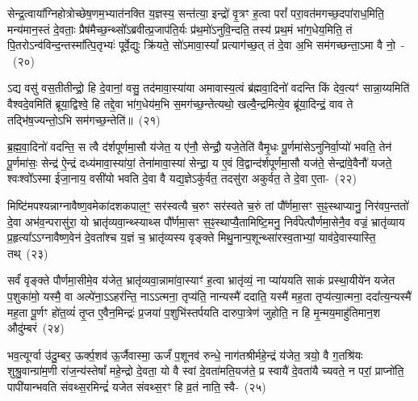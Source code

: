 सेन्द्र॒त्वाया᳚ग्निहोत्रोच्छेष॒णम॒भ्यात॑नक्ति य॒ज्ञस्य॒ सन्त॑त्या॒ इन्द्रो॑ वृ॒त्रꣳ ह॒त्वा परां᳚ परा॒वत॑मगच्छ॒दपा॑राध॒मिति॒ मन्य॑मान॒स्तं दे॒वताः॒ प्रैष॑मैच्छ॒न्थ्सो᳚\-ऽब्रवीत्प्र॒जा\-प॑ति॒र्यः प्र॑थ॒मो॑\-ऽनुवि॒न्दति॒ तस्य॑ प्रथ॒मं भा॑ग॒धेय॒मिति॒ तं पि॒तरो\-ऽन्व॑विन्द॒न्तस्मा᳚त्पि॒तृभ्यः॑ पूर्वे॒द्युः क्रि॑यते॒ सो॑\-ऽमावा॒स्यां᳚ प्रत्याग॑च्छ॒त् तं दे॒वा अ॒भि सम॑गच्छन्ता॒\-ऽमा वै नो॒~-~(२०)\ip

ऽद्य वसु॑ वस॒तीतीन्द्रो॒ हि दे॒वानां॒ वसु॒ तद॑मावा॒स्या॑या अमावास्य॒त्वं ब्र॑ह्मवा॒दिनो॑ वदन्ति किं देव॒त्यꣳ॑ सान्ना॒य्यमिति॑ वैश्वदे॒वमिति॑ ब्रूया॒द्विश्वे॒ हि तद्दे॒वा भा॑ग॒धेय॑म॒भि स॒मग॑च्छ॒न्तेत्यथो॒ खल्वै॒न्द्रमित्ये॒व ब्रू॑या॒दिन्द्रं॒ वाव ते तद्भि॑ष॒ज्यन्तो॒\-ऽभि सम॑गच्छ॒न्तेति॑॥~(२१)\ip

{}

ब्र॒ह्म॒वा॒दिनो॑ वदन्ति॒ स त्वै द॑र्\mbox{}शपूर्णमा॒सौ य॑जेत॒ य ए॑नौ॒ सेन्द्रौ॒ यजे॒तेति॑ वैमृ॒धः पू॒र्णमा॑से\-ऽनुनिर्वा॒प्यो॑ भवति॒ तेन॑ पू॒र्णमा॑सः॒ सेन्द्र॑ ऐ॒न्द्रं दध्य॑मावा॒स्या॑यां॒ तेना॑मावा॒स्या॑ सेन्द्रा॒ य ए॒वं वि॒द्वान्द॑र्\mbox{}शपूर्णमा॒सौ यज॑ते॒ सेन्द्रा॑वे॒वैनौ॑ यजते॒ श्वःश्वो᳚\-ऽस्मा ईजा॒नाय॒ वसी॑यो भवति दे॒वा वै यद्य॒ज्ञे\-ऽकु॑र्वत॒ तदसु॑रा अकुर्वत॒ ते दे॒वा ए॒ता-~(२२)\ip

मिष्टि॑मपश्यन्नाग्नावैष्ण॒वमेका॑\-दश\-कपाल॒ꣳ॒ सर॑स्वत्यै च॒रुꣳ सर॑स्वते च॒रुं तां पौ᳚र्णमा॒सꣳ स॒ꣴ॒स्थाप्यानु॒ निर॑वप॒न्ततो॑ दे॒वा अभ॑व॒न्परासु॑रा॒ यो भ्रातृ॑व्यवा॒न्थ्स्याथ्स पौ᳚र्णमा॒सꣳ स॒ꣴ॒स्थाप्यै॒तामिष्टि॒मनु॒ निर्व॑पेत्पौर्णमा॒सेनै॒व वज्रं॒ भ्रातृ॑व्याय प्र॒हृत्या᳚\-ऽऽ\-ग्नावैष्ण॒वेन॑ दे॒वता᳚श्च य॒ज्ञं च॒ भ्रातृ॑व्यस्य वृङ्क्ते मिथु॒नान्प॒शून्थ्सा॑\-रस्व॒ताभ्यां॒ याव॑दे॒वास्यास्ति॒ तथ्~(२३)\ip

सर्वं॑ वृङ्क्ते पौर्णमा॒सीमे॒व य॑जेत॒ भ्रातृ॑व्यवा॒न्नामा॑वा॒स्याꣳ॑ ह॒त्वा भ्रातृ॑व्यं॒ ना प्या॑ययति साकं प्रस्था॒यीये॑न यजेत प॒शुका॑मो॒ यस्मै॒ वा अल्पे॑ना॒\-ऽऽ\-हर॑न्ति॒ ना\-ऽऽ\-त्मना॒ तृप्य॑ति॒ नान्यस्मै॑ ददाति॒ यस्मै॑ मह॒ता तृप्य॑त्या॒त्मना॒ ददा᳚त्य॒न्यस्मै॑ मह॒ता पू॒र्णꣳ हो॑त॒व्यं॑ तृ॒प्त ए॒वैन॒मिन्द्रः॑ प्र॒जया॑ प॒शुभि॑स्तर्पयति दारुपा॒त्रेण॑ जुहोति॒ न हि मृ॒न्मय॒माहु॑तिमान॒श औदु॑म्बरं~(२४)\ip

भव॒त्यूर्ग्वा उ॑दु॒म्बर॒ ऊर्क्प॒शव॑ ऊ॒र्जैवास्मा॒ ऊर्जं॑ प॒शूनव॑ रुन्धे॒ नाग॑तश्रीर्महे॒न्द्रं य॑जेत॒ त्रयो॒ वै ग॒तश्रि॑यः शुश्रु॒वान्ग्रा॑म॒णी रा॑ज॒न्य॑स्तेषां᳚ महे॒न्द्रो दे॒वता॒ यो वै स्वां दे॒वता॑मति॒यज॑ते॒ प्र स्वायै॑ दे॒वता॑यै च्यवते॒ न परां॒ प्राप्नो॑ति॒ पापी॑यान्भवति संवथ्स॒रमिन्द्रं॑ यजेत संवथ्स॒रꣳ हि व्र॒तं नाति॒ स्वै-~(२५)\ip

